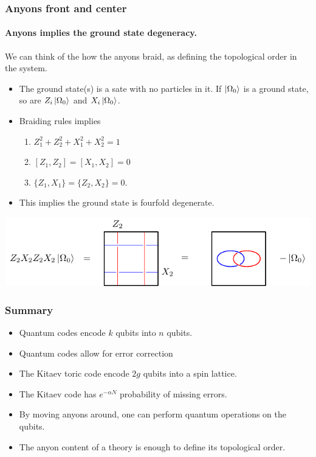 \documentclass{beamer}
\renewcommand{\(}{\left(}
\renewcommand{\)}{\right)}
\renewcommand{\[}{\left[}
\renewcommand{\]}{\right]}
\begin{document}
\begin{frame}
    \frametitle{Anyons front and center}
    \framesubtitle{Anyons implies the ground state degeneracy.}

    \begin{framed}
        We can think of the how the anyons braid, as defining the topological order in the system.
    \end{framed}
    \begin{itemize}
        \item The ground state(s) is a sate with no particles in it. If $\ket{\Omega_0}$ is a ground state, so are $Z_i \ket{\Omega_0}$ and $X_i \ket{\Omega_0}$.
    \end{itemize}
    \begin{itemize}
        \item Braiding rules implies \begin{enumerate}
            \item $Z^2_1 + Z^2_2 + X^2_1 + X^2_2 = 1$
            \item $\[Z_1, Z_2 \] = \[X_1, X_2 \] = 0$
            \item $\{Z_1, X_1 \} = \{Z_2, X_2 \} = 0$.
        \end{enumerate}
        \item This implies the ground state is fourfold degenerate. 
    \end{itemize}
    \includegraphics[scale=0.9]{anyons_ground_state.pdf}
    
    
\end{frame}

\begin{frame}
    \frametitle{Summary}

    \begin{itemize}
        \item Quantum codes encode $k$ qubits into $n$ qubits. 
        \item Quantum codes allow for error correction 
        \item The Kitaev toric code encode $2g$ qubits into a spin lattice.  
        \item The Kitaev code has $e^{-\alpha N}$ probability of missing errors. 
        \item By moving anyons around, one can perform quantum operations on the qubits. 
        \item The anyon content of a theory is enough to define its topological order.
    \end{itemize}

\end{frame}




\end{document}
